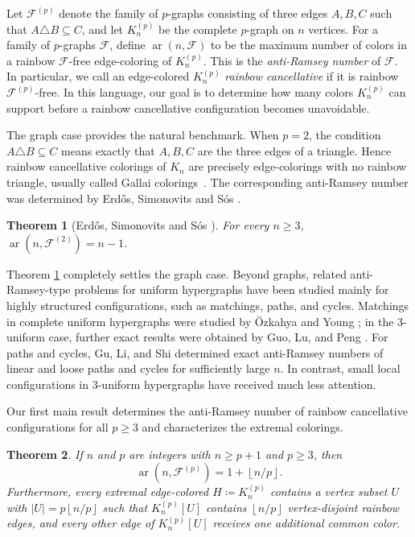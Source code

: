 \documentclass[10pt,a4paper]{article}
\newtheorem{theorem}{Theorem}[section]
\theoremstyle{definition}
\newcommand{\cF}{\mathcal{F}}
\newcommand{\floor}[1]{\left\lfloor #1 \right\rfloor}
\DeclareMathOperator{\ar}{ar}
\begin{document}
Let $\cF^{(p)}$ denote the family of $p$-graphs consisting of three edges $A,B,C$ such that $A\triangle B\subseteq C$, and let $K_n^{(p)}$ be the complete $p$-graph on $n$ vertices.
For a family of $p$-graphs $\cF$, define $\ar(n,\cF)$ to be the maximum number of colors in a rainbow $\cF$-free edge-coloring of $K_n^{(p)}$. This is the {\it anti-Ramsey number} of $\cF$.
In particular, we call an edge-colored $K_n^{(p)}$ {\it rainbow cancellative} if it is rainbow $\cF^{(p)}$-free.
In this language, our goal is to determine how many colors $K_n^{(p)}$ can support before a rainbow cancellative configuration becomes unavoidable.

The graph case provides the natural benchmark.
When $p=2$, the condition $A\triangle B\subseteq C$ means exactly that $A,B,C$ are the three edges of a triangle.
Hence rainbow cancellative colorings of $K_n$ are precisely edge-colorings with no rainbow triangle, usually called Gallai colorings~\cite{gallai}. The corresponding anti-Ramsey number was determined by Erd\H{o}s, Simonovits and S\'os \cite{erdos1975}.

\begin{theorem}[Erd\H{o}s, Simonovits and S\'os \cite{erdos1975}]\label{thm:ess}
    For every $n\ge3$, $\ar(n,\cF^{(2)})=n-1$.
\end{theorem}


Theorem \ref{thm:ess} completely settles the graph case.
Beyond graphs, related anti-Ramsey-type problems for uniform hypergraphs have been studied mainly for highly structured configurations, such as matchings, paths, and cycles.
Matchings in complete uniform hypergraphs were studied by \"Ozkahya and Young \cite{ozkahya2013}; in the $3$-uniform case, further exact results were obtained by Guo, Lu, and Peng \cite{guo2023}.
For paths and cycles, Gu, Li, and Shi \cite{gu2020} determined exact anti-Ramsey numbers of linear and loose paths and cycles for sufficiently large $n$.
In contrast, small local configurations in $3$-uniform hypergraphs have received much less attention.

Our first main result determines the anti-Ramsey number of rainbow cancellative configurations for all $p\ge3$ and characterizes the extremal colorings.

\begin{theorem}\label{thm:rainbow cancellative}
    If $n$ and $p$ are integers with $n\ge p+1$ and $p\ge3$, then
    \[
        \ar(n,\cF^{(p)})=1+\floor{n/p}.
    \]
    Furthermore, every extremal edge-colored $H \coloneqq K_n^{(p)}$ contains a vertex subset $U$ with $|U|=p\floor{n/p}$ such that $K_n^{(p)}[U]$ contains $\floor{n/p}$ vertex-disjoint rainbow edges, and every other edge of $K_n^{(p)}[U]$ receives one additional common color.
\end{theorem}
\end{document}
